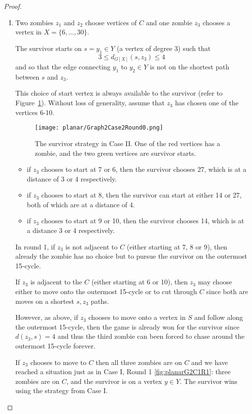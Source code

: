 \begin{proof}
\begin{enumerate}[I.]
\item Two zombies $z_1$ and $z_2$ choose vertices of $C$ and one zombie $z_3$ chooses a vertex in $X = \{ 6, \dots, 30 \}$.\label{planar case 2}

The survivor starts on $s = y_1 \in Y$  (a vertex of degree 3) such that
\[3 \leq d_{G[X]}(s, z_3) \leq 4\]
 and so that the edge connecting $y_1$ to $y_2 \in Y$
is not on the shortest path between $s$ and $z_3$.

This choice of start vertex is always available to the survivor (refer to Figure~\ref{fig:planarG2C2R0}). Without loss of generality, assume that $z_3$ has chosen one of the vertices 6-10.

\begin{figure}
\centering
\texttt{[image: planar/Graph2Case2Round0.png]}
\caption{The survivor strategy in Case II. One of the red vertices has a zombie, and the two green vertices are survivor starts. \label{fig:planarG2C2R0}}
\end{figure}

\begin{itemize}
\item if $z_3$ chooses to start at 7 or 6, then the survivor chooses 27, which is at a distance of 3 or 4 respectively.
\item if $z_3$ chooses to start at 8, then the survivor can start at either 14 or 27, both of which are at a distance of 4.
\item if $z_3$ chooses to start at 9 or 10, then the survivor chooses 14, which is at a distance 3 or 4 respectively.
\end{itemize}

In round 1, if $z_3$ is not adjacent to $C$ (either starting at 7, 8 or 9), then already the zombie has no choice but to pursue the survivor on the outermost 15-cycle.

If $z_3$ is adjacent to the $C$ (either starting at 6 or 10), then $z_3$ may choose either to move onto the outermost 15-cycle or to cut through $C$ since both are moves on a shortest $s,z_3$ paths.

However, as above, if $z_3$ chooses to move onto a vertex in $S$ and follow along the outermost 15-cycle, then the game is already won for the survivor since
$d(z_3, s) = 4$ and thus the third zombie can been forced to chase around the outermost 15-cycle forever.

If $z_3$ chooses to move to $C$ then all three zombies are on $C$ and we have reached a situation just as in Case I, Round 1 \ref{fig:planarG2C1R1}: three zombies are on $C$, and the survivor is on a vertex $y\in Y$. The survivor wins using the strategy from Case I.


\end{enumerate}
\end{proof}
